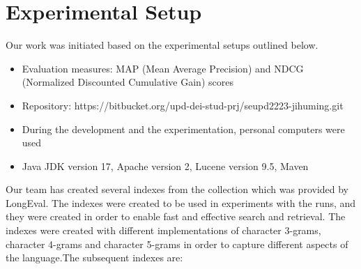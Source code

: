 \section{Experimental Setup}
\label{sec:setup}

Our work was initiated based on the experimental setups outlined below.
\begin{itemize}
	\item Evaluation measures: MAP (Mean Average Precision) and NDCG (Normalized Discounted Cumulative Gain) scores
	\item Repository: https://bitbucket.org/upd-dei-stud-prj/seupd2223-jihuming.git 
	\item During the development and the experimentation, personal computers were used
	\item Java JDK version 17, Apache version 2, Lucene version 9.5, Maven
\end{itemize}
Our team has created several indexes from the collection which was provided by LongEval. The indexes were created to be used in experiments with the runs, and they were created in order to enable fast and effective search and retrieval. The indexes were created with different implementations of character 3-grams,  character 4-grams and  character 5-grams in order to capture different aspects of the language.The subsequent indexes are:
